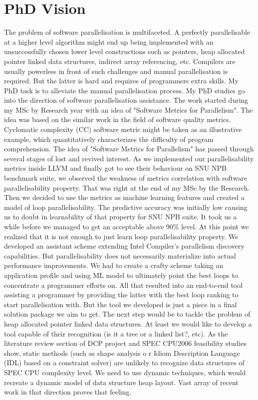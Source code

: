 \documentclass[10pt,a4paper]{report}
\begin{document}
\chapter{PhD Vision}
\quad The problem of software parallelisation is multifaceted. A perfectly parallelisable at a higher level algorithm might end up being implemented with an unsuccessfully chosen lower level constructions such as pointers, heap allocated pointer linked data structures, indirect array referencing, etc. Compilers are usually powerless in front of such challenges and manual parallelisation is required. But the latter is hard and requires of programmers extra skills. My PhD task is to alleviate the manual parallelisation process.\newline\null    
\quad My PhD studies go into the direction of software parallelisation assistance. The work started during my MSc by Research year with an idea of "Software Metrics for Parallelism". The idea was based on the similar work in the field of software quality metrics. Cyclomatic complexity (CC) software metric might be taken as an illustrative example, which quantitatively characterizes the difficulty of program comprehension. The idea of "Software Metrics for Parallelism" has passed through several stages of lost and revived interest. As we implemented our parallelisability metrics inside LLVM and finally got to see their behaviour on SNU NPB benchmark suite, we observed the weakness of metrics correlation with software parallelisability property. That was right at the end of my MSc by the Research. Then we decided to use the metrics as machine learning features and created a model of loop parallelisability. The predictive accuracy was initially low causing us to doubt in learnability of that property for SNU NPB suite. It took us a while before we managed to get an acceptable above 90\% level. At this point we realized that it is not enough to just learn loop parallelisability property. We developed an assistant scheme extending Intel Compiler's parallelism discovery capabilities. But parallelisability does not necessarily materialize into actual performance improvements. We had to create a crafty scheme taking an application profile and using ML model to ultimately point the best loops to concentrate a programmer efforts on. All that resulted into an end-to-end tool assisting a programmer by providing the latter with the best loop ranking to start parallelisation with.\newline\null
\quad But the tool we developed is just a piece in a final solution package we aim to get. The next step would be to tackle the problem of heap allocated pointer linked data structures. At least we would like to develop a tool capable of their recognition (is it a tree or a linked list?, etc). As the literature review section of DCP project and SPEC CPU2006 feasibility studies show, static methods (such as shape analysis o
r Idiom Description Language (IDL) based on a constraint solver) are unlikely to recognize data structures of SPEC CPU complexity level. We need to use dynamic techniques, which would recreate a dynamic model of data structure heap layout. Vast array of recent work in that direction proves that feeling.    
\end{document}
